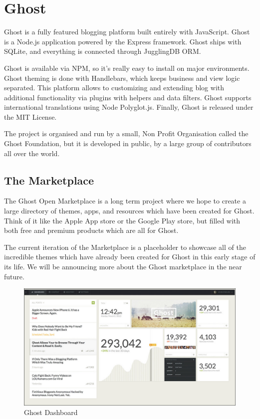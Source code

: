 \section{Ghost}
\label{sec:CMS_ghost}

Ghost is a fully featured blogging platform built entirely with JavaScript.
Ghost is a Node.js application powered by the Express framework. Ghost ships with SQLite, and everything is connected through JugglingDB ORM.

Ghost is available via NPM, so it’s really easy to install on major environments.
Ghost theming is done with Handlebars, which keeps business and view logic separated. 
This platform allows to customizing and extending blog with additional functionality via plugins with helpers and data filters. Ghost supports international translations using Node Polyglot.js.
Finally, Ghost is released under the MIT License. \cite{cms_ghost}

The project is organised and run by a small, Non Profit Organisation called the Ghost Foundation, but it is developed in public, by a large group of contributors all over the world.

\subsection{The Marketplace}
\label{subsec:ghost_market}
The Ghost Open Marketplace is a long term project where we hope to create a large directory of themes, apps, and resources which have been created for Ghost. Think of it like the Apple App store or the Google Play store, but filled with both free and premium products which are all for Ghost.

The current iteration of the Marketplace is a placeholder to showcase all of the incredible themes which have already been created for Ghost in this early stage of its life. We will be announcing more about the Ghost marketplace in the near future. \cite{cms_ghost_over}




\begin {figure}[h]
\graphicspath{{images/chapter_cms/}}
\includegraphics[width=\textwidth]{ghost_dash}
\caption{Ghost Dashboard}
\end {figure}
